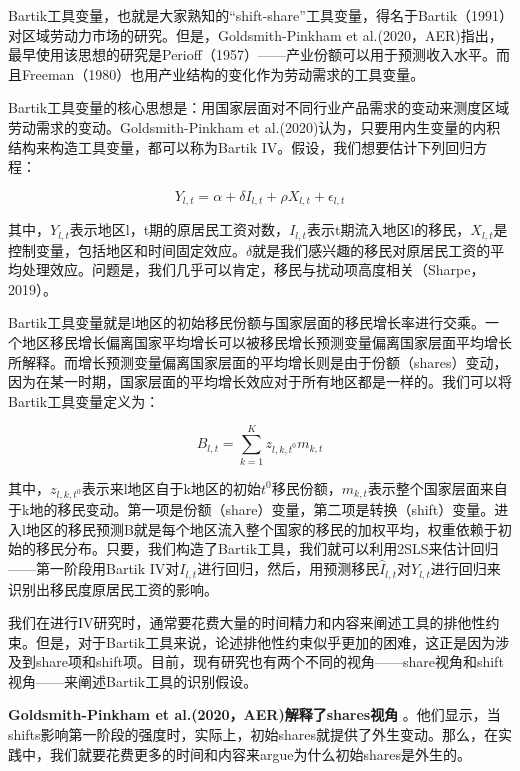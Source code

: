 \documentclass[cn,12pt,math=newtx,citestyle=gb7714-2015,bibstyle=gb7714-2015]{elegantbook}
\begin{document}
	Bartik工具变量，也就是大家熟知的“shift-share”工具变量，得名于Bartik（1991）对区域劳动力市场的研究。但是，Goldsmith-Pinkham et al.(2020，AER)指出，最早使用该思想的研究是Perioff（1957）——产业份额可以用于预测收入水平。而且Freeman（1980）也用产业结构的变化作为劳动需求的工具变量。
	
	Bartik工具变量的核心思想是：用国家层面对不同行业产品需求的变动来测度区域劳动需求的变动。Goldsmith-Pinkham et al.(2020)认为，只要用内生变量的内积结构来构造工具变量，都可以称为Bartik IV。假设，我们想要估计下列回归方程：
	
	\begin{equation}
		Y_{l,t} = \alpha + \delta I_{l,t} +\rho X_{l,t} + \epsilon_{l,t}
	\end{equation}
	
	其中，$Y_{l,t}$表示地区l，t期的原居民工资对数，$I_{l,t}$表示t期流入地区l的移民，$X_{l,t}$是控制变量，包括地区和时间固定效应。$\delta$就是我们感兴趣的移民对原居民工资的平均处理效应。问题是，我们几乎可以肯定，移民与扰动项高度相关（Sharpe，2019）。
	
	Bartik工具变量就是l地区的初始移民份额与国家层面的移民增长率进行交乘。一个地区移民增长偏离国家平均增长可以被移民增长预测变量偏离国家层面平均增长所解释。而增长预测变量偏离国家层面的平均增长则是由于份额（shares）变动，因为在某一时期，国家层面的平均增长效应对于所有地区都是一样的。我们可以将Bartik工具变量定义为：
	
	\begin{equation}
		B_{l,t} = \sum_{k=1}^{K} z_{l,k,t^0} m_{k,t}
	\end{equation}
	
	其中，$z_{l,k,t^0}$表示来l地区自于k地区的初始$t^0$移民份额，$m_{k,t}$表示整个国家层面来自于k地的移民变动。第一项是份额（share）变量，第二项是转换（shift）变量。进入l地区的移民预测B就是每个地区流入整个国家的移民的加权平均，权重依赖于初始的移民分布。只要，我们构造了Bartik工具，我们就可以利用2SLS来估计回归——第一阶段用Bartik IV对$I_{l,t}$进行回归，然后，用预测移民$\hat{I}_{l,t}$对$Y_{l,t}$进行回归来识别出移民度原居民工资的影响。
	
	我们在进行IV研究时，通常要花费大量的时间精力和内容来阐述工具的排他性约束。但是，对于Bartik工具来说，论述排他性约束似乎更加的困难，这正是因为涉及到share项和shift项。目前，现有研究也有两个不同的视角——share视角和shift视角——来阐述Bartik工具的识别假设。
	
	\textbf{Goldsmith-Pinkham et al.(2020，AER)解释了shares视角} 。他们显示，当shifts影响第一阶段的强度时，实际上，初始shares就提供了外生变动。那么，在实践中，我们就要花费更多的时间和内容来argue为什么初始shares是外生的。
	
\end{document}

